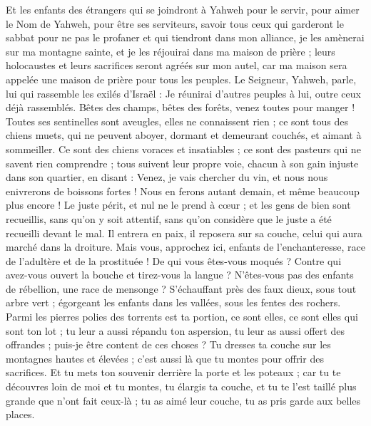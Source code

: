 \begin{multicols}{2}
Et les enfants des étrangers qui se joindront à Yahweh pour le servir, pour aimer le Nom de Yahweh, pour être ses serviteurs, savoir tous ceux qui garderont le sabbat pour ne pas le profaner et qui tiendront dans mon alliance,
je les amènerai sur ma montagne sainte, et je les réjouirai dans ma maison de prière ; leurs holocaustes et leurs sacrifices seront agréés sur mon autel, car ma maison sera appelée une maison de prière pour tous les peuples.
Le Seigneur, Yahweh, parle, lui qui rassemble les exilés d'Israël : Je réunirai d'autres peuples à lui, outre ceux déjà rassemblés.
Bêtes des champs, bêtes des forêts, venez toutes pour manger !
Toutes ses sentinelles sont aveugles, elles ne connaissent rien ; ce sont tous des chiens muets, qui ne peuvent aboyer, dormant et demeurant couchés, et aimant à sommeiller.
Ce sont des chiens voraces et insatiables ; ce sont des pasteurs qui ne savent rien comprendre ; tous suivent leur propre voie, chacun à son gain injuste dans son quartier, en disant :
Venez, je vais chercher du vin, et nous nous enivrerons de boissons fortes ! Nous en ferons autant demain, et même beaucoup plus encore !
\VerseOne{}Le juste périt, et nul ne le prend à cœur ; et les gens de bien sont recueillis, sans qu'on y soit attentif, sans qu'on considère que le juste a été recueilli devant le mal.
Il entrera en paix, il reposera sur sa couche, celui qui aura marché dans la droiture.
Mais vous, approchez ici, enfants de l'enchanteresse, race de l'adultère et de la prostituée !
De qui vous êtes-vous moqués ? Contre qui avez-vous ouvert la bouche et tirez-vous la langue ? N'êtes-vous pas des enfants de rébellion, une race de mensonge ?
S'échauffant près des faux dieux, sous tout arbre vert ; égorgeant les enfants dans les vallées, sous les fentes des rochers.
Parmi les pierres polies des torrents est ta portion, ce sont elles, ce sont elles qui sont ton lot ; tu leur a aussi répandu ton aspersion, tu leur as aussi offert des offrandes ; puis-je être content de ces choses ?
Tu dresses ta couche sur les montagnes hautes et élevées ; c'est aussi là que tu montes pour offrir des sacrifices.
Et tu mets ton souvenir derrière la porte et les poteaux ; car tu te découvres loin de moi et tu montes, tu élargis ta couche, et tu te l'est taillé plus grande que n'ont fait ceux-là ; tu as aimé leur couche, tu as pris garde aux belles places.

\end{multicols}
